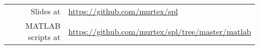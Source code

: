 
\title[\metabrief]{\metatitle}
\subtitle{\metasubject}

\author{\metaauthor\\[0.5ex]\small{(\href{mailto:kuberski@uni-potsdam.de}{\nolinkurl{kuberski@uni-potsdam.de}})}}
\date{\metadate}

\begin{frame}
	\titlepage
	\begin{center}
		\small
		\begin{tabular}{rl}
			Slides at&\url{https://github.com/murtex/spl}\\
			MATLAB scripts at&\url{https://github.com/murtex/spl/tree/master/matlab}
		\end{tabular}
	\end{center}
\end{frame}

